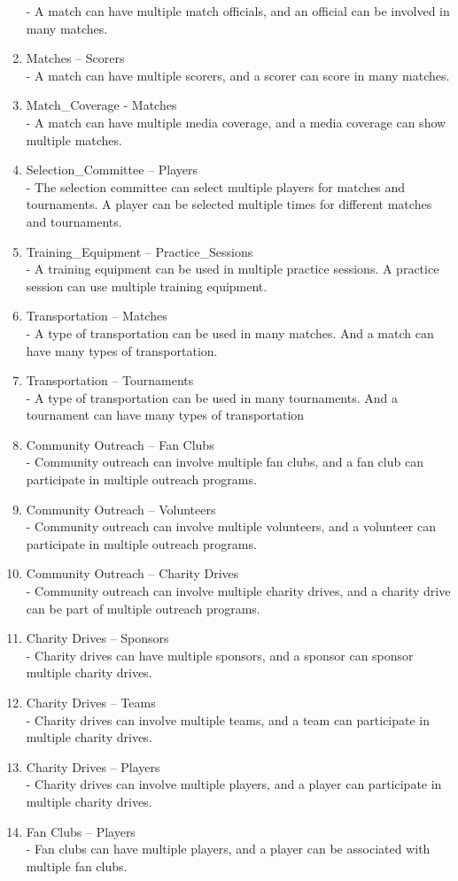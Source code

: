 \documentclass[a4paper, 12pt]{article}
\begin{document}
\begin{enumerate}
- A match can have multiple match officials, and an official can be involved in many matches.
\item Matches – Scorers \\
- A match can have multiple scorers, and a scorer can score in many matches.
\item Match\_Coverage - Matches\\
- A match can have multiple media coverage, and a media coverage can show multiple matches.
\item Selection\_Committee – Players \\
- The selection committee can select multiple players for matches and tournaments. A player can be selected multiple times for different matches and tournaments.
\item Training\_Equipment – Practice\_Sessions \\
- A training equipment can be used in multiple practice sessions. A practice session can use multiple training equipment.
\item Transportation – Matches \\
- A type of transportation can be used in many matches. And a match can have many types of transportation.
\item Transportation – Tournaments \\
- A type of transportation can be used in many tournaments. And a tournament can have many types of transportation
\item Community Outreach – Fan Clubs \\
- Community outreach can involve multiple fan clubs, and a fan club can participate in multiple outreach programs.
\item Community Outreach – Volunteers \\
- Community outreach can involve multiple volunteers, and a volunteer can participate in multiple outreach programs.
\item Community Outreach – Charity Drives \\
- Community outreach can involve multiple charity drives, and a charity drive can be part of multiple outreach programs.
\item Charity Drives – Sponsors \\
- Charity drives can have multiple sponsors, and a sponsor can sponsor multiple charity drives.
\item Charity Drives – Teams \\
- Charity drives can involve multiple teams, and a team can participate in multiple charity drives.
\item Charity Drives – Players \\
- Charity drives can involve multiple players, and a player can participate in multiple charity drives.
\item Fan Clubs – Players \\
- Fan clubs can have multiple players, and a player can be associated with multiple fan clubs.
\end{enumerate}
\end{document}
